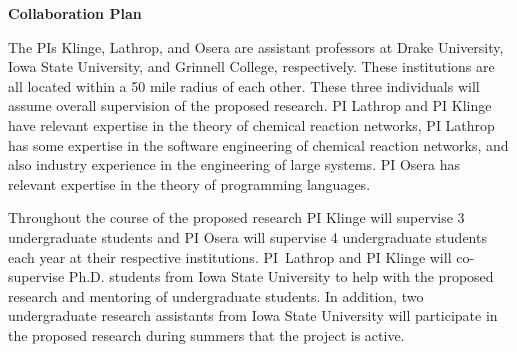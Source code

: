 \documentclass[11pt]{article}
\begin{document}
    \setcounter{page}{1}
    \begin{center}
        {\Large {\bf Collaboration Plan}}
    \end{center}

      The PIs Klinge, Lathrop, and Osera are assistant professors at Drake University, Iowa State University, and Grinnell College, respectively.
      These institutions are all located within a 50 mile radius of each other.
      These three individuals will assume overall supervision of the proposed research.
      PI Lathrop and PI Klinge have relevant expertise in the theory of chemical reaction networks, PI Lathrop has some expertise in the software engineering of chemical reaction networks, and also industry experience in the engineering of large systems.
      PI Osera has relevant expertise in the theory of programming languages.
    
      Throughout the course of the proposed research PI Klinge will supervise 3 undergraduate students and PI Osera will supervise 4 undergraduate students each year at their respective institutions.
      PI~Lathrop and PI Klinge will co-supervise Ph.D. students from Iowa State University to help with the proposed research and mentoring of undergraduate students.
      In addition, two undergraduate research assistants from Iowa State University will participate in the proposed research during summers that the project is active.
      
\end{document}
